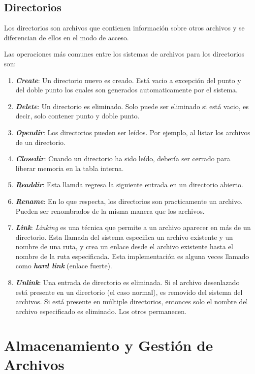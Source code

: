 \documentclass[12pt, a4paper]{article} %
\begin{document}
\subsection{Directorios}

Los directorios son archivos que contienen información sobre otros archivos y se
diferencian de ellos en el modo de acceso.

Las operaciones más comunes entre los sistemas de archivos para los directorios son:

\begin{enumerate}
	\item \textbf{\textit{Create}}: Un directorio nuevo es creado. Está vacio a excepción del punto y del doble punto los cuales son generados automaticamente por el sistema.
	\item \textbf{\textit{Delete}}: Un directorio es eliminado. Solo puede ser eliminado si está vacio, es decir, solo contener punto y doble punto.
	\item \textbf{\textit{Opendir}}: Los directorios pueden ser leídos. Por ejemplo, al listar los archivos de un directorio.
	\item \textbf{\textit{Closedir}}: Cuando un directorio ha sido leído, debería ser cerrado para liberar memoria en la tabla interna.
	\item \textbf{\textit{Readdir}}: Esta llamda regresa la siguiente entrada en un directorio abierto.
	\item \textbf{\textit{Rename}}: En lo que respecta, los directorios son practicamente un archivo. Pueden ser renombrados de la misma manera que los archivos.
	\item \textbf{\textit{Link}}: \textit{Linking} es una técnica que permite a un archivo aparecer en más de un directorio. Esta llamada del sistema especifica un archivo existente y un nombre de una ruta, y crea un enlace desde el archivo existente hasta el nombre de la ruta especificada. Esta implementación es alguna veces llamado como \textbf{\textit{hard link}} (enlace fuerte).
	\item \textbf{\textit{Unlink}}: Una entrada de directorio es eliminada. Si el archivo desenlazado está presente en un directorio (el caso normal), es removido del sistema del archivos. Si está presente en múltiple directorios, entonces solo el nombre del archivo especificado es eliminado. Los otros permanecen.
\end{enumerate}

\clearpage
\section{Almacenamiento y Gestión de Archivos}
\end{document}
